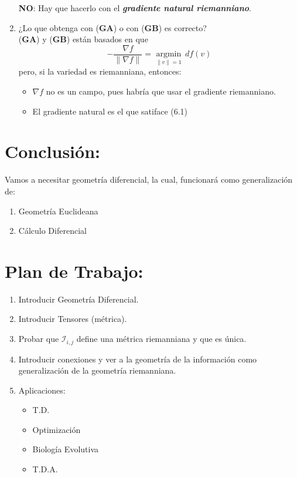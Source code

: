 \begin{enumerate}
    \textbf{NO}: Hay que hacerlo con el \textit{\textbf{gradiente natural riemanniano}}.
    \item ¿Lo que obtenga con (\textbf{GA}) o con (\textbf{GB}) es correcto?\\
    
    (\textbf{GA}) y (\textbf{GB}) est\'an basados en que
    \begin{equation}
        -\frac{\nabla f}{\|\nabla f\|}=\underset{\|v\|=1}{\text{arg}\min}\,df(v)
    \end{equation}
    pero, si la variedad es riemanniana, entonces:
    \begin{itemize}
        \item $\nabla f$ no es un campo, pues habr\'ia que usar el gradiente riemanniano.
        \item El gradiente natural es el que satiface (6.1)
    \end{itemize}
\end{enumerate}

\section*{Conclusi\'on:} 
\noindent Vamos a necesitar geometr\'ia diferencial, la cual, funcionar\'a como generalizaci\'on de:
\begin{enumerate}
    \item Geometr\'ia Euclideana
    \item C\'alculo Diferencial
\end{enumerate}

\section*{Plan de Trabajo:}
\begin{enumerate}
    \item Introducir Geometr\'ia Diferencial.
    \item Introducir Tensores (m\'etrica).
    \item Probar que $\mathcal{I}_{i,j}$ define una m\'etrica riemanniana y que es \'unica.
    \item Introducir conexiones y ver a la geometr\'ia de la informaci\'on como generalizaci\'on de la geometr\'ia riemanniana.
    \item Aplicaciones:
    \begin{itemize}
        \item T.D.
        \item Optimizaci\'on
        \item Biolog\'ia Evolutiva
        \item T.D.A.
    \end{itemize}
\end{enumerate}